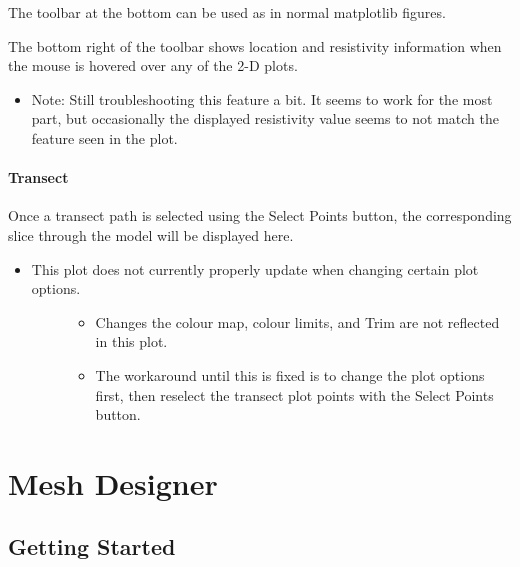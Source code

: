 \documentclass[letterpaper,10pt,english]{sphinxmanual}
\begin{document}
The toolbar at the bottom can be used as in normal matplotlib figures.

The bottom right of the toolbar shows location and resistivity information when the mouse is hovered over any of the 2-D plots.
\begin{itemize}
\item {} 
Note: Still troubleshooting this feature a bit. It seems to work for the most part, but occasionally the displayed resistivity value seems to not match the feature seen in the plot.

\end{itemize}


\paragraph{Transect}
\label{\detokenize{content/model_viewer/main_window:transect}}
Once a transect path is selected using the Select Points button, the corresponding slice through the model will be displayed here.
\begin{itemize}
\item {} \begin{description}
\item[{This plot does not currently properly update when changing certain plot options.}] \leavevmode\begin{itemize}
\item {} 
Changes the colour map, colour limits, and Trim are not reflected in this plot.

\item {} 
The workaround until this is fixed is to change the plot options first, then reselect the transect plot points with the Select Points button.

\end{itemize}

\end{description}

\end{itemize}


\section{Mesh Designer}
\label{\detokenize{index:mesh-designer}}

\subsection{Getting Started}
\label{\detokenize{content/mesh_designer/getting_started:getting-started}}\label{\detokenize{content/mesh_designer/getting_started::doc}}
\end{document}
